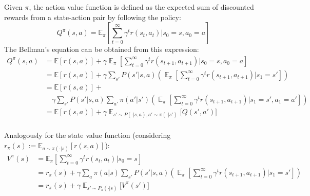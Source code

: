 \documentclass[12pt,a4paper,openright,twoside]{article}
\DeclareMathOperator*{\E}{\mathbb{E}}
\numberwithin{equation}{section}
\theoremstyle{definition}
\theoremstyle{remark}
\theoremstyle{plain}
\begin{document}
Given $\pi$, the action value function is defined as the expected sum of discounted rewards from a state-action pair by following the policy:
\begin{equation} \label{AV}
Q^\pi (s,a) = \mathbb{E}_\pi \left[ \sum_{t=0}^\infty \gamma^t r(s_t,a_t) \bigg| s_0=s, a_0=a \right] 
\end{equation}
The Bellman's equation can be obtained from this expression:
\begin{equation} \label{BE}
\begin{split}
    Q^\pi (s,a) &= \mathbb{E} \left[ r(s,a) \right] + \gamma \E_\pi \left[ \sum_{t=0}^\infty \gamma^t r(s_{t+1},a_{t+1}) \bigg| s_0=s, a_0=a \right] \\
    &= \mathbb{E} \left[ r(s,a) \right] + \gamma \sum_{s'} P(s'|s,a) \left( \E_\pi \left[ \sum_{t=0}^\infty \gamma^t r(s_{t+1},a_{t+1}) \bigg| s_1=s' \right] \right) \\
    &= \mathbb{E} \left[ r(s,a) \right] + \\
    & \quad \gamma \sum_{s'} P(s'|s,a) \sum_{a'} \pi(a'|s')\left( \E_\pi \left[ \sum_{t=0}^\infty \gamma^t r(s_{t+1},a_{t+1}) \bigg| s_1=s', a_1=a' \right] \right)\\
    &= \mathbb{E} \left[ r(s,a) \right] + \gamma \E_{s'\sim P(\cdot | s,a), a' \sim \pi(\cdot | s')} \bigg[Q(s',a') \bigg] \\
\end{split}
\end{equation}


Analogously for the state value function (considering $r_\pi(s) := \mathbb{E}_{a\sim\pi(\cdot | s)} \left[ r(s,a) \right]$):
\begin{equation} \label{SV}
\begin{split}
    V^\pi (s) &= \mathbb{E}_\pi \left[ \sum_{t=0}^\infty \gamma^t r(s_t,a_t) \bigg| s_0=s\right] \\
    &= r_\pi(s) + \gamma \sum_a \pi(a | s) \sum_{s'} P(s'|s,a) \left( \E_\pi \left[ \sum_{t=0}^\infty \gamma^t r(s_{t+1},a_{t+1}) \bigg| s_1=s' \right] \right) \\
    &= r_\pi(s) + \gamma \E_{s'\sim P_{\pi}(\cdot | s)} \bigg[V^\pi(s') \bigg]
\end{split}
\end{equation}
\end{document}
